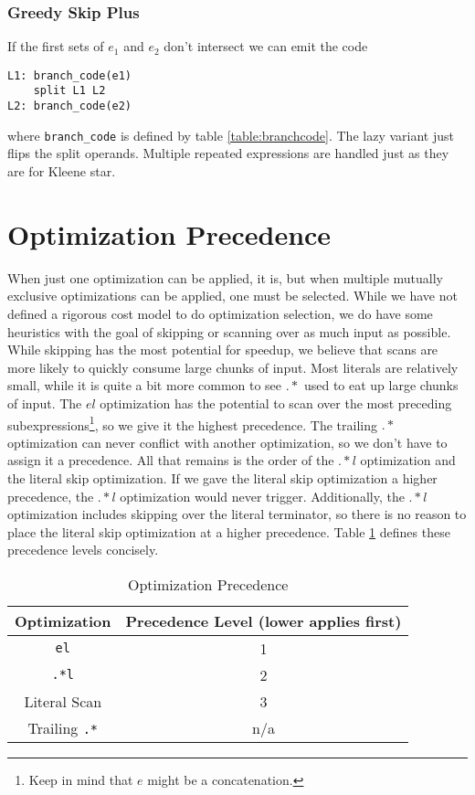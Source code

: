 \subsubsection{Greedy Skip Plus}

If the first sets of $e_1$ and $e_2$ don't intersect we can emit
the code

\begin{verbatim}
L1: branch_code(e1)
    split L1 L2
L2: branch_code(e2)
\end{verbatim}

\noindent
where \verb'branch_code' is defined by table \ref{table:branchcode}.
The lazy variant just flips the split operands. Multiple
repeated expressions are handled just as they are for
Kleene star.

\section{Optimization Precedence}
\label{section:optprecedence}

When just one optimization can be applied, it is, but when multiple
mutually exclusive optimizations can be applied, one must be
selected. While we have not defined a rigorous cost model
to do optimization selection, we do have some heuristics
with the goal of skipping or scanning over as much input as possible.
While skipping has the most potential for speedup, we
believe that scans are more likely to quickly consume large
chunks of input. Most literals are relatively small, while
it is quite a bit more common to see $.*$ used to eat
up large chunks of input. The $el$ optimization has the
potential to scan over the most preceding subexpressions\footnote{
Keep in mind that $e$ might be a concatenation.},
so we give it the highest precedence. The trailing $.*$ optimization
can never conflict with another optimization, so we don't have to
assign it a precedence. All that remains is the order of the $.*l$
optimization and the literal skip optimization. If we gave the
literal skip optimization a higher precedence, the $.*l$
optimization would never trigger. Additionally, the $.*l$
optimization includes skipping over the literal terminator,
so there is no reason to place the literal skip optimization
at a higher precedence. Table \ref{table:optprec} defines these
precedence levels concisely.

\begin{table}
\caption{Optimization Precedence}
\label{table:optprec}

\centering

\begin{tabular}{| c | c |} \hline
Optimization & Precedence Level (lower applies first) \\ \hline
\verb'el' & 1 \\ \hline
\verb'.*l' & 2 \\ \hline
Literal Scan & 3 \\ \hline
Trailing \verb'.*' & n/a \\ \hline
\end{tabular}
\end{table}

